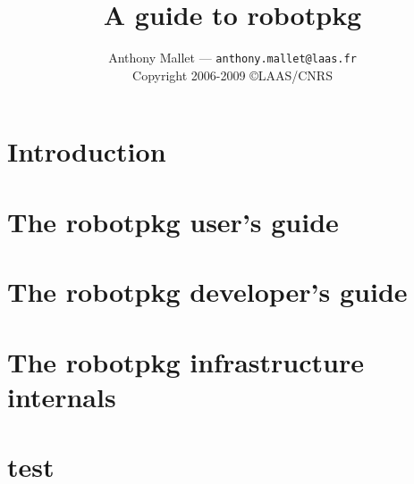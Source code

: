 \documentclass[a4paper,11pt]{book}
\title{A guide to robotpkg}
\author{
   Anthony Mallet --- {\tt anthony.mallet@laas.fr}\\[1em]
   Copyright 2006-2009 \copyright LAAS/CNRS
}
\begin{document}

\frontmatter
\maketitle
\tableofcontents
\mainmatter

\chapter{Introduction}
\label{chapter:introduction}


\chapter{The robotpkg user's guide}
\label{chapter:user}


%

\chapter{The robotpkg developer's guide}
\label{chapter:developer}

\chapter{The robotpkg infrastructure internals}
\label{chapter:internal}
\chapter{test}
%
\end{document}
